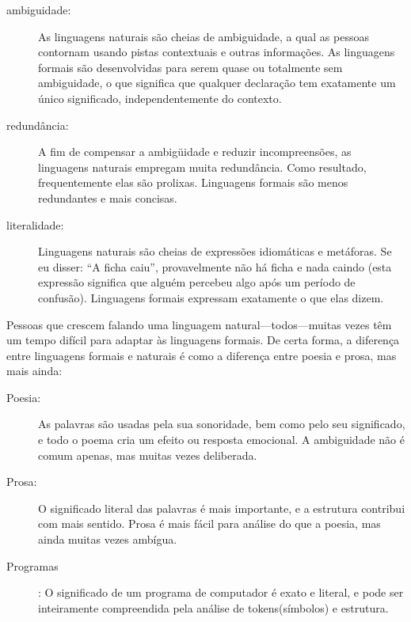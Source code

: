 \documentclass[10pt]{book}
\begin{document}
\begin{description}

\item[ambiguidade:] As linguagens naturais são cheias de ambiguidade, a qual
as pessoas contornam usando pistas contextuais e outras informações.
As linguagens formais são desenvolvidas para serem quase ou totalmente sem ambiguidade,
o que significa que qualquer declaração tem exatamente um único significado,
independentemente do contexto.

\item[redundância:] A fim de compensar a ambigüidade e reduzir
incompreensões, as linguagens naturais empregam muita
redundância. Como resultado, frequentemente elas são prolixas. Linguagens formais
são menos redundantes e mais concisas.

\item[literalidade:] Linguagens naturais são cheias de expressões idiomáticas e metáforas.
Se eu disser: ``A ficha caiu'', provavelmente não há ficha e
nada caindo (esta expressão significa que alguém percebeu algo
após um período de confusão). Linguagens formais
expressam exatamente o que elas dizem.

\end{description}

Pessoas que crescem falando uma linguagem natural---todos---muitas vezes têm um
tempo difícil para adaptar às linguagens formais. De certa forma, a diferença
entre linguagens formais e naturais é como a diferença entre
poesia e prosa, mas mais ainda:

\begin{description}

\item[Poesia:] As palavras são usadas pela sua sonoridade, bem como pelo
seu significado, e todo o poema cria um efeito ou
resposta emocional. A ambiguidade não é comum apenas, mas muitas vezes
deliberada.

\item[Prosa:] O significado literal das palavras é mais importante,
e a estrutura contribui com mais sentido. Prosa é mais fácil para
análise do que a poesia, mas ainda muitas vezes ambígua.

\item[Programas]: O significado de um programa de computador é exato
e literal, e pode ser inteiramente compreendida pela análise de
tokens(símbolos) e estrutura.

\end{description}
\end{document}
